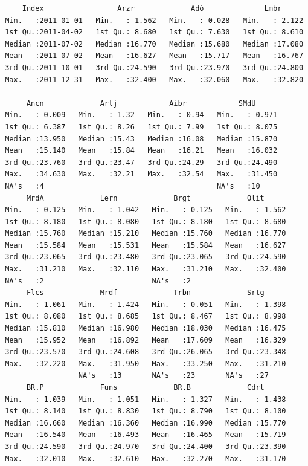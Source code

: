 \begin{verbatim}
     Index                 Arzr             Adó              Lmbr       
 Min.   :2011-01-01   Min.   : 1.562   Min.   : 0.028   Min.   : 2.122  
 1st Qu.:2011-04-02   1st Qu.: 8.680   1st Qu.: 7.630   1st Qu.: 8.610  
 Median :2011-07-02   Median :16.770   Median :15.680   Median :17.080  
 Mean   :2011-07-02   Mean   :16.627   Mean   :15.717   Mean   :16.767  
 3rd Qu.:2011-10-01   3rd Qu.:24.590   3rd Qu.:23.970   3rd Qu.:24.800  
 Max.   :2011-12-31   Max.   :32.400   Max.   :32.060   Max.   :32.820  
                                                                        
      Ancn             Artj            Aibr            SMdU       
 Min.   : 0.009   Min.   : 1.32   Min.   : 0.94   Min.   : 0.971  
 1st Qu.: 6.387   1st Qu.: 8.26   1st Qu.: 7.99   1st Qu.: 8.075  
 Median :13.950   Median :15.43   Median :16.08   Median :15.870  
 Mean   :15.140   Mean   :15.84   Mean   :16.21   Mean   :16.032  
 3rd Qu.:23.760   3rd Qu.:23.47   3rd Qu.:24.29   3rd Qu.:24.490  
 Max.   :34.630   Max.   :32.21   Max.   :32.54   Max.   :31.450  
 NA's   :4                                        NA's   :10      
      MrdA             Lern             Brgt             Olit       
 Min.   : 0.125   Min.   : 1.042   Min.   : 0.125   Min.   : 1.562  
 1st Qu.: 8.180   1st Qu.: 8.080   1st Qu.: 8.180   1st Qu.: 8.680  
 Median :15.760   Median :15.210   Median :15.760   Median :16.770  
 Mean   :15.584   Mean   :15.531   Mean   :15.584   Mean   :16.627  
 3rd Qu.:23.065   3rd Qu.:23.480   3rd Qu.:23.065   3rd Qu.:24.590  
 Max.   :31.210   Max.   :32.110   Max.   :31.210   Max.   :32.400  
 NA's   :2                         NA's   :2                        
      Flcs             Mrdf             Trbn             Srtg       
 Min.   : 1.061   Min.   : 1.424   Min.   : 0.051   Min.   : 1.398  
 1st Qu.: 8.080   1st Qu.: 8.685   1st Qu.: 8.467   1st Qu.: 8.998  
 Median :15.810   Median :16.980   Median :18.030   Median :16.475  
 Mean   :15.952   Mean   :16.892   Mean   :17.609   Mean   :16.329  
 3rd Qu.:23.570   3rd Qu.:24.608   3rd Qu.:26.065   3rd Qu.:23.348  
 Max.   :32.220   Max.   :31.950   Max.   :33.250   Max.   :31.210  
                  NA's   :13       NA's   :23       NA's   :27      
      BR.P             Funs             BR.B             Cdrt       
 Min.   : 1.039   Min.   : 1.051   Min.   : 1.327   Min.   : 1.438  
 1st Qu.: 8.140   1st Qu.: 8.830   1st Qu.: 8.790   1st Qu.: 8.100  
 Median :16.660   Median :16.360   Median :16.990   Median :15.770  
 Mean   :16.540   Mean   :16.493   Mean   :16.465   Mean   :15.719  
 3rd Qu.:24.590   3rd Qu.:24.970   3rd Qu.:24.400   3rd Qu.:23.390  
 Max.   :32.010   Max.   :32.610   Max.   :32.270   Max.   :31.170  
                                                                    

\end{verbatim}
